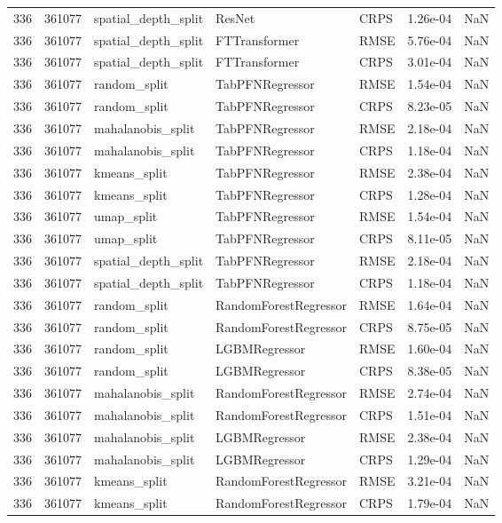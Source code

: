 \begin{tabular}{rrlllrr}
336 & 361077 & spatial\_depth\_split & ResNet & CRPS & 1.26e-04 & NaN \\
336 & 361077 & spatial\_depth\_split & FTTransformer & RMSE & 5.76e-04 & NaN \\
336 & 361077 & spatial\_depth\_split & FTTransformer & CRPS & 3.01e-04 & NaN \\
336 & 361077 & random\_split & TabPFNRegressor & RMSE & 1.54e-04 & NaN \\
336 & 361077 & random\_split & TabPFNRegressor & CRPS & 8.23e-05 & NaN \\
336 & 361077 & mahalanobis\_split & TabPFNRegressor & RMSE & 2.18e-04 & NaN \\
336 & 361077 & mahalanobis\_split & TabPFNRegressor & CRPS & 1.18e-04 & NaN \\
336 & 361077 & kmeans\_split & TabPFNRegressor & RMSE & 2.38e-04 & NaN \\
336 & 361077 & kmeans\_split & TabPFNRegressor & CRPS & 1.28e-04 & NaN \\
336 & 361077 & umap\_split & TabPFNRegressor & RMSE & 1.54e-04 & NaN \\
336 & 361077 & umap\_split & TabPFNRegressor & CRPS & 8.11e-05 & NaN \\
336 & 361077 & spatial\_depth\_split & TabPFNRegressor & RMSE & 2.18e-04 & NaN \\
336 & 361077 & spatial\_depth\_split & TabPFNRegressor & CRPS & 1.18e-04 & NaN \\
336 & 361077 & random\_split & RandomForestRegressor & RMSE & 1.64e-04 & NaN \\
336 & 361077 & random\_split & RandomForestRegressor & CRPS & 8.75e-05 & NaN \\
336 & 361077 & random\_split & LGBMRegressor & RMSE & 1.60e-04 & NaN \\
336 & 361077 & random\_split & LGBMRegressor & CRPS & 8.38e-05 & NaN \\
336 & 361077 & mahalanobis\_split & RandomForestRegressor & RMSE & 2.74e-04 & NaN \\
336 & 361077 & mahalanobis\_split & RandomForestRegressor & CRPS & 1.51e-04 & NaN \\
336 & 361077 & mahalanobis\_split & LGBMRegressor & RMSE & 2.38e-04 & NaN \\
336 & 361077 & mahalanobis\_split & LGBMRegressor & CRPS & 1.29e-04 & NaN \\
336 & 361077 & kmeans\_split & RandomForestRegressor & RMSE & 3.21e-04 & NaN \\
336 & 361077 & kmeans\_split & RandomForestRegressor & CRPS & 1.79e-04 & NaN \\

\end{tabular}
